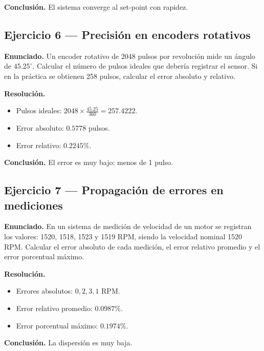 \documentclass[12pt,a4paper]{report}
\begin{document}
	\textbf{Conclusión.} El sistema converge al set-point con rapidez.
	
	\subsection*{Ejercicio 6 --- Precisión en encoders rotativos}
	
	\textbf{Enunciado.} Un encoder rotativo de 2048 pulsos por revolución mide un ángulo de $45.25^\circ$. Calcular el número de pulsos ideales que debería registrar el sensor. Si en la práctica se obtienen 258 pulsos, calcular el error absoluto y relativo.
	
	\textbf{Resolución.}
	\begin{itemize}
		\item Pulsos ideales: $2048\times\tfrac{45.25}{360}=257.4222$.
		\item Error absoluto: $0.5778$ pulsos.
		\item Error relativo: $0.2245\%$.
	\end{itemize}
	
	\textbf{Conclusión.} El error es muy bajo: menos de 1 pulso.
	
	\subsection*{Ejercicio 7 --- Propagación de errores en mediciones}
	
	\textbf{Enunciado.} En un sistema de medición de velocidad de un motor se registran los valores: 1520, 1518, 1523 y 1519 RPM, siendo la velocidad nominal 1520 RPM. Calcular el error absoluto de cada medición, el error relativo promedio y el error porcentual máximo.
	
	\textbf{Resolución.}
	\begin{itemize}
		\item Errores absolutos: $0,2,3,1$ RPM.
		\item Error relativo promedio: $0.0987\%$.
		\item Error porcentual máximo: $0.1974\%$.
	\end{itemize}
	
	\textbf{Conclusión.} La dispersión es muy baja.
	
\end{document}
